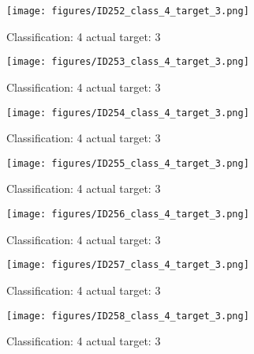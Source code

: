 \begin{figure}[h!]
\begin{center}
\texttt{[image: figures/ID252\_class\_4\_target\_3.png]}
\end{center}
\caption{ Classification: 4 actual target: 3}
\label{fig:ID252_class_4_target_3}
\end{figure}
\begin{figure}[h!]
\begin{center}
\texttt{[image: figures/ID253\_class\_4\_target\_3.png]}
\end{center}
\caption{ Classification: 4 actual target: 3}
\label{fig:ID253_class_4_target_3}
\end{figure}
\begin{figure}[h!]
\begin{center}
\texttt{[image: figures/ID254\_class\_4\_target\_3.png]}
\end{center}
\caption{ Classification: 4 actual target: 3}
\label{fig:ID254_class_4_target_3}
\end{figure}
\begin{figure}[h!]
\begin{center}
\texttt{[image: figures/ID255\_class\_4\_target\_3.png]}
\end{center}
\caption{ Classification: 4 actual target: 3}
\label{fig:ID255_class_4_target_3}
\end{figure}
\begin{figure}[h!]
\begin{center}
\texttt{[image: figures/ID256\_class\_4\_target\_3.png]}
\end{center}
\caption{ Classification: 4 actual target: 3}
\label{fig:ID256_class_4_target_3}
\end{figure}
\begin{figure}[h!]
\begin{center}
\texttt{[image: figures/ID257\_class\_4\_target\_3.png]}
\end{center}
\caption{ Classification: 4 actual target: 3}
\label{fig:ID257_class_4_target_3}
\end{figure}
\begin{figure}[h!]
\begin{center}
\texttt{[image: figures/ID258\_class\_4\_target\_3.png]}
\end{center}
\caption{ Classification: 4 actual target: 3}
\label{fig:ID258_class_4_target_3}
\end{figure}
